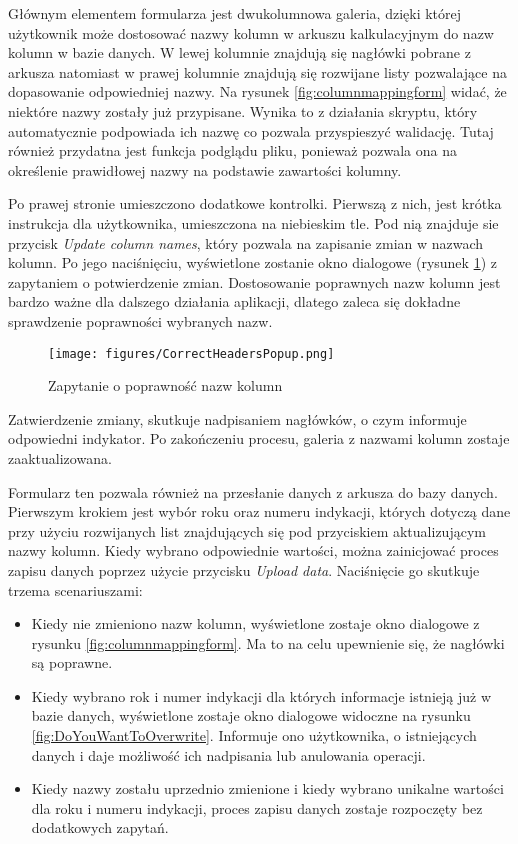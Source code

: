 Głównym elementem formularza jest dwukolumnowa galeria, dzięki której użytkownik może dostosować nazwy kolumn w arkuszu kalkulacyjnym do nazw kolumn w bazie danych. W lewej kolumnie znajdują się nagłówki pobrane z arkusza natomiast w prawej kolumnie znajdują się rozwijane listy pozwalające na dopasowanie odpowiedniej nazwy. Na rysunek \ref{fig:columnmappingform} widać, że niektóre nazwy zostały już przypisane. Wynika to z działania skryptu, który automatycznie podpowiada ich nazwę co pozwala przyspieszyć walidację. Tutaj również przydatna jest funkcja podglądu pliku, ponieważ pozwala ona na określenie prawidłowej nazwy na podstawie zawartości kolumny.

Po prawej stronie umieszczono dodatkowe kontrolki. Pierwszą z nich, jest krótka instrukcja dla użytkownika, umieszczona na niebieskim tle.
Pod nią znajduje sie przycisk \emph{Update column names}, który pozwala na zapisanie zmian w nazwach kolumn. Po jego naciśnięciu, wyświetlone zostanie okno dialogowe (rysunek \ref{fig:CorrectHeadersPopup}) z zapytaniem o potwierdzenie zmian. Dostosowanie poprawnych nazw kolumn jest bardzo ważne dla dalszego działania aplikacji, dlatego zaleca się dokładne sprawdzenie poprawności wybranych nazw.
\begin{figure}[h]
    \centering
    \texttt{[image: figures/CorrectHeadersPopup.png]}
    \caption{Zapytanie o poprawność nazw kolumn}
    \label{fig:CorrectHeadersPopup}
\end{figure}
Zatwierdzenie zmiany, skutkuje nadpisaniem nagłówków, o czym informuje odpowiedni indykator. Po zakończeniu procesu, galeria z nazwami kolumn zostaje zaaktualizowana.

Formularz ten pozwala również na przesłanie danych z arkusza do bazy danych. Pierwszym krokiem jest wybór roku oraz numeru indykacji, których dotyczą dane przy użyciu rozwijanych list znajdujących się pod przyciskiem aktualizującym nazwy kolumn. Kiedy wybrano odpowiednie wartości, można zainicjować proces zapisu danych poprzez użycie przycisku \emph{Upload data}. Naciśnięcie go skutkuje trzema scenariuszami:
\begin{itemize}
    \item Kiedy nie zmieniono nazw kolumn, wyświetlone zostaje okno dialogowe z rysunku \ref{fig:columnmappingform}. Ma to na celu upewnienie się, że nagłówki są poprawne.
    \item Kiedy wybrano rok i numer indykacji dla których informacje istnieją już w bazie danych, wyświetlone zostaje okno dialogowe widoczne na rysunku \ref{fig:DoYouWantToOverwrite}. Informuje ono użytkownika, o istniejących danych i daje możliwość ich nadpisania lub anulowania operacji.
    \item Kiedy nazwy zostału uprzednio zmienione i kiedy wybrano unikalne wartości dla roku i numeru indykacji, proces zapisu danych zostaje rozpoczęty bez dodatkowych zapytań.
\end{itemize}

